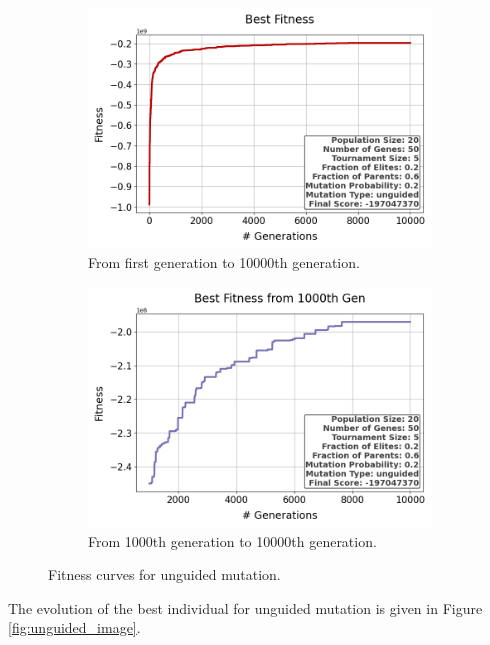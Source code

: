 \documentclass{assignment}
\begin{document}
\begin{figure}[H]
    \begin{subfigure}{0.5\textwidth}
        \includegraphics[width=\textwidth]{figures/best_fitness_output_20_50_5_0.2_0.6_0.2_unguided.png}
        \caption{From first generation to 10000th generation.}
    \end{subfigure}\hfill
    \begin{subfigure}{0.5\textwidth}
        \includegraphics[width=\textwidth]{figures/best_fitness_1000_output_20_50_5_0.2_0.6_0.2_unguided.png}
        \caption{From 1000th generation to 10000th generation.}
    \end{subfigure}
    \caption{Fitness curves for unguided mutation.}
\label{fig:unguided}
\end{figure}

The evolution of the best individual for unguided mutation is given in Figure \ref{fig:unguided_image}.
\end{document}
